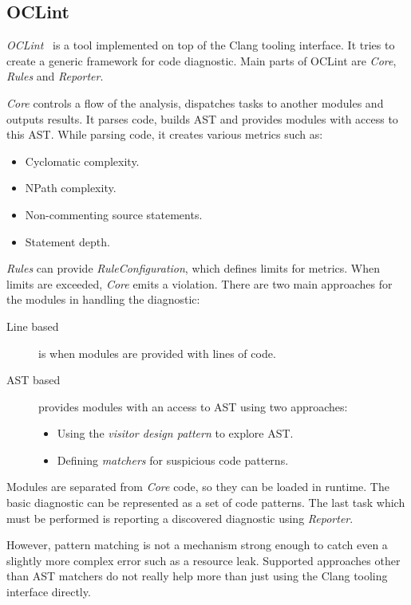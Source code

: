 \subsection{OCLint}
\emph{OCLint}~\cite{oclint} is a tool implemented on top of the Clang tooling interface. It tries to create a generic framework for code diagnostic. Main parts of OCLint are \emph{Core}, \emph{Rules} and \emph{Reporter}.

\emph{Core} controls a flow of the analysis, dispatches tasks to another modules and outputs results. It parses code, builds AST and provides modules with access to this AST. While parsing code, it creates various metrics such as:

\begin{itemize}
\item Cyclomatic complexity.
\item NPath complexity.
\item Non-commenting source statements.
\item Statement depth.
\end{itemize}

\emph{Rules} can provide \emph{RuleConfiguration}, which defines limits for metrics. When limits are exceeded, \emph{Core} emits a violation. There are two main approaches for the modules in handling the diagnostic:

\begin{description}
\item[Line based] is when modules are provided with lines of code.
\item[AST based] provides modules with an access to AST using two approaches:
	\begin{itemize}
	\item Using the \emph{visitor design pattern} to explore AST.
	\item Defining \emph{matchers} for suspicious code patterns.
	\end{itemize}
\end{description}

Modules are separated from \emph{Core} code, so they can be loaded in runtime. The basic diagnostic can be represented as a set of code patterns. The last task which must be performed is reporting a discovered diagnostic using \emph{Reporter}.

However, pattern matching is not a mechanism strong enough to catch even a slightly more complex error such as a resource leak. Supported approaches other than AST matchers do not really help more than just using the Clang tooling interface directly.

